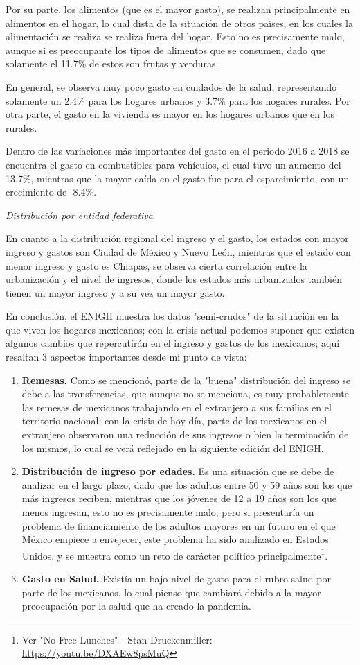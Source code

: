 Por su parte, los alimentos (que es el mayor gasto), se realizan principalmente en alimentos en el hogar, lo cual dista de la situación de otros países, en los cuales la alimentación se realiza se realiza fuera del hogar. Esto no es precisamente malo, aunque si es preocupante los tipos de alimentos que se consumen, dado que solamente el 11.7\% de estos son frutas y verduras.

En general, se observa muy poco gasto en cuidados de la salud, representando solamente un 2.4\% para los hogares urbanos y 3.7\% para los hogares rurales. Por otra parte, el gasto en la vivienda es mayor en los hogares urbanos que en los rurales.

Dentro de las variaciones más importantes del gasto en el periodo 2016 a 2018 se encuentra el gasto en combustibles para vehículos, el cual tuvo un aumento del 13.7\%, mientras que la mayor caída en el gasto fue para el esparcimiento, con un crecimiento de -8.4\%.

\textit{Distribución por entidad federativa}

En cuanto a la distribución regional del ingreso y el gasto, los estados con mayor ingreso y gastos son Ciudad de México y Nuevo León, mientras que el estado con menor ingreso y gasto es Chiapas, se observa cierta correlación entre la urbanización y el nivel de ingresos, donde los estados más urbanizados también tienen un mayor ingreso y a su vez un mayor gasto.

En conclusión, el ENIGH muestra los datos "semi-crudos" de la situación en la que viven los hogares mexicanos; con la crisis actual podemos suponer que existen algunos cambios que repercutirán en el ingreso y gastos de los mexicanos; aquí resaltan 3 aspectos importantes desde mi punto de vista:
\begin{enumerate}
    \item \textbf{Remesas.} Como se mencionó, parte de la "buena" distribución del ingreso se debe a las transferencias, que aunque no se menciona, es muy probablemente las remesas de mexicanos trabajando en el extranjero a sus familias en el territorio nacional; con la crisis de hoy día, parte de los mexicanos en el extranjero observaron una reducción de sus ingresos o bien la terminación de los mismos, lo cual se verá reflejado en la siguiente edición del ENIGH.
    \item \textbf{Distribución de ingreso por edades.} Es una situación que se debe de analizar en el largo plazo, dado que los adultos entre 50 y 59 años son los que más ingresos reciben, mientras que los jóvenes de 12 a 19 años son los que menos ingresan, esto no es precisamente malo; pero si presentaría un problema de financiamiento de los adultos mayores en un futuro en el que México empiece a envejecer, este problema ha sido analizado en Estados Unidos, y se muestra como un reto de carácter político principalmente\footnote{Ver "No Free Lunches" - Stan Druckenmiller: \href{https://youtu.be/DXAEw8psMuQ}{https://youtu.be/DXAEw8psMuQ}}.
    \item \textbf{Gasto en Salud.} Existía un bajo nivel de gasto para el rubro salud por parte de los mexicanos, lo cual pienso que cambiará debido a la mayor preocupación por la salud que ha creado la pandemia.
\end{enumerate}
\cite{ENIGH2018}